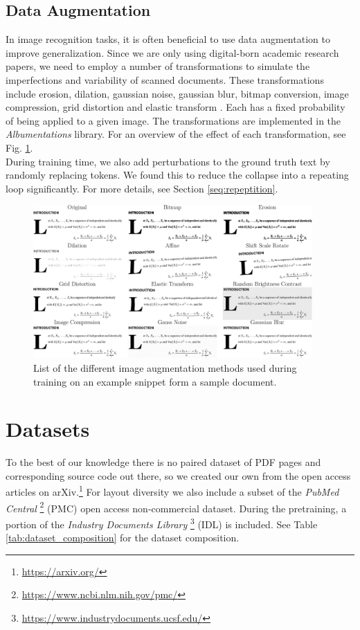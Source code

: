 \documentclass[]{article}
\newcommand{\footurl}[1]{\footnote{\url{#1}}}
\begin{document}
\subsection{Data Augmentation}
In image recognition tasks, it is often beneficial to use data augmentation to improve generalization. Since we are only using digital-born academic research papers, we need to employ a number of transformations to simulate the imperfections and variability of scanned documents. These transformations include erosion, dilation, gaussian noise, gaussian blur, bitmap conversion, image compression, grid distortion and elastic transform \cite{simard_best_2003}. Each has a fixed probability of being applied to a given image. The transformations are implemented in the \emph{Albumentations} \cite{buslaev_albumentations_2020} library. For an overview of the effect of each transformation, see Fig. \ref{fig:augmentations}.
\\During training time, we also add perturbations to the ground truth text by randomly replacing tokens. We found this to reduce the collapse into a repeating loop significantly. For more details, see Section \ref{seq:repeptition}.
\begin{figure}
    \centering
    \includegraphics[width=0.95\textwidth]{figures/aug.pdf}
    \caption{List of the different image augmentation methods used during training on an example snippet form a sample document.}
    \label{fig:augmentations}
\end{figure}

\section{Datasets}
To the best of our knowledge there is no paired dataset of PDF pages and corresponding source code out there, so we created our own from the open access articles on arXiv.\footurl{https://arxiv.org/} For layout diversity we also include a subset of the \emph{PubMed Central} \footurl{https://www.ncbi.nlm.nih.gov/pmc/} (PMC) open access non-commercial dataset. During the pretraining, a portion of the \emph{Industry Documents Library} \footnote{\url{https://www.industrydocuments.ucsf.edu/}} (IDL) is included. See Table \ref{tab:dataset_composition} for the dataset composition.
\end{document}
